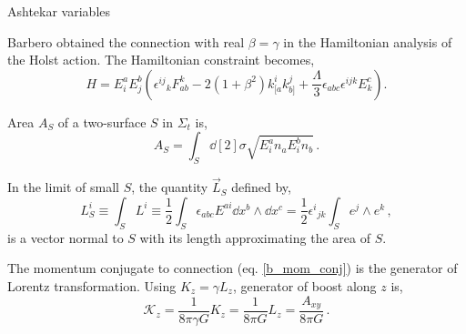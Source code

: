 \documentclass{beamer}
\begin{document}
\begin{frame}{Ashtekar variables}
    \begin{list}{\maltese}{\leftmargin=1em \itemindent=0em}
        \item<1-> Barbero obtained the connection with real $\beta=\gamma$ in the Hamiltonian analysis of the Holst action. The Hamiltonian constraint becomes,
        \begin{equation}
            H=E^a_i E^b_j\left({\epsilon^{ij}}_k F^k_{ab}-2(1+\beta^2)k^i_{[a}k^j_{b]}+\frac{\Lambda}{3}\epsilon_{abc}\epsilon^{ijk}E^c_k\right).
        \end{equation}
        \item<2-> Area $A_S$ of a two-surface $S$ in $\Sigma_t$ is,
        \begin{equation}
            A_S=\int_S \dd[2]{\sigma}\sqrt{E^a_i n_a E^b_i n_b}\,.
        \end{equation}
        \item<3-> In the limit of small $S$, the quantity $\vec{L}_S$ defined by,
        \begin{equation}
            L_S^i\equiv\int_S L^i\equiv\frac{1}{2}\int_S \epsilon_{abc} E^{ai} \dd{x^b}\wedge\dd{x^c}=\frac{1}{2}{\epsilon^{i}}_{jk}\int_S e^j \wedge e^k\,,
        \end{equation}
        is a vector normal to $S$ with its length approximating the area of $S$.
        \item<4-> The momentum conjugate to connection (eq. \ref{b_mom_conj}) is the generator of Lorentz transformation. Using $K_z=\gamma L_z$, generator of boost along $z$ is,
        \begin{equation}
            \mathcal{K}_z=\frac{1}{8\pi\gamma G}K_z=\frac{1}{8\pi G}L_z=\frac{A_{xy}}{8\pi G}\,.
        \end{equation}
    \end{list}
\end{frame}
\end{document}
